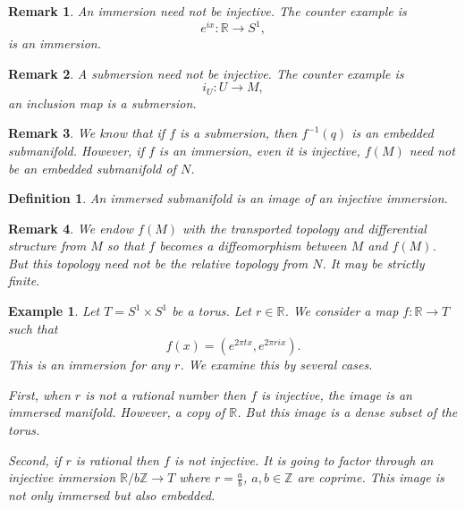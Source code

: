 \documentclass{article}
\newtheorem{definition}{Definition}[section]
\newtheorem{remark}{Remark}[section]
\newtheorem{example}{Example}[section]
\numberwithin{equation}{section}
\begin{document}
\begin{remark}
An immersion need not be injective. The counter example is 
\begin{equation*}
e^{ix}:\mathbb{R}\to S^1,
\end{equation*}
is an immersion.
\end{remark}

\begin{remark}
A submersion need not be injective. The counter example is 
\begin{equation*}
i_U:U\to M,
\end{equation*}
an inclusion map is a submersion.
\end{remark}

\begin{remark}
We know that if $f$ is a submersion, then $f^{-1}(q)$ is an embedded submanifold. However, if $f$ is an immersion, even it is injective,  $f(M)$ need not be an embedded submanifold of $N$.
\end{remark}

\begin{definition}
An immersed submanifold is an image of an injective immersion. 
\end{definition}

\begin{remark}
We endow $f(M)$ with the transported topology and differential structure from $M$ so that $f$ becomes a diffeomorphism between $M$ and $f(M)$. But this topology need not be the relative topology from $N$. It may be strictly finite.
\end{remark}

\begin{example}
Let $T=S^1\times S^1$ be a torus. Let $r\in\mathbb{R}$. We consider a map $f:\mathbb{R}\to T$ such that
\begin{equation*}
f(x) = (e^{2\pi t x},e^{2\pi ri x}).
\end{equation*}
This is an immersion for any $r$. We examine this by several cases. \\
\par First, when $r$ is not a rational number then $f$ is injective, the image is an immersed manifold. However, a copy of $\mathbb{R}$. But this image is a dense subset of the torus. \\
\par Second, if $r$ is rational then $f$ is not injective. It is going to factor through an injective immersion $\mathbb{R}/b\mathbb{Z}\to T$ where $r={\frac a b}$, $a,b\in\mathbb{Z}$ are coprime. This image is not only immersed but also embedded. \\
\end{example}
\end{document}
